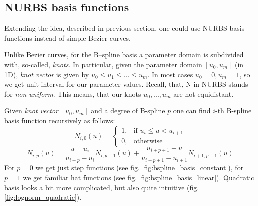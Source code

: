 \subsection{NURBS basis functions}
Extending the idea, described in previous section, one could use NURBS basis functions instead of simple Bezier curves. 

Unlike Bezier curves, for the B--spline basis a parameter domain is subdivided with, so-called, \textit{knots}. In particular, given the parameter domain $[u_{0}, u_{m}]$ (in 1D), \textit{knot vector} is given by $u_{0} \leq u_{1} \leq ... \leq u_{m}$. In most cases $u_{0} = 0, u_{m} = 1$, so we get unit interval for our parameter values. Recall, that, N in NURBS stands for \textit{non-uniform}. This means, that our knots $u_{0},..., u_{m}$ are not equidistant.

Given \textit{knot vector} $[u_{0}, u_{m}]$ and a degree of B-spline $p$ one can find $i$-th B-spline basis function recursively as follows:
\begin{equation}
N_{i,0}(u) =  \begin{cases} 1, & \mbox{if } u_{i} \leq u < u_{i+1} \\ 0, & \mbox{otherwise } \end{cases}
\end{equation} 
\begin{equation}
N_{i,p}(u) = \frac{u - u_{i}}{u_{i+p} - u_{i}}N_{i, p-1}(u)  + \frac{u_{i+p+1}-u}{u_{i+p+1} - u_{i+1}}N_{i+1, p-1}(u)
\end{equation}
For $p=0$ we get just step functions (see fig. \ref{fig:bspline_basis_constant}), for $p=1$ we get familiar hat functions (see fig. \ref{fig:bspline_basis_linear}). Quadratic basis looks a bit more complicated, but also quite intuitive (fig. \ref{fig:lognorm_quadratic}).
